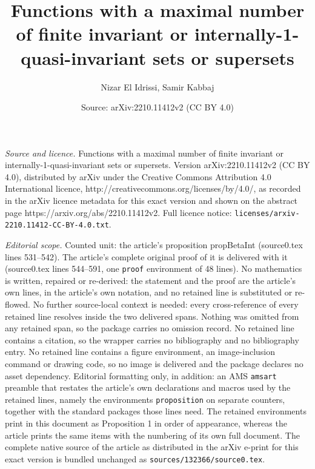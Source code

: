 \documentclass[10pt,a4paper]{amsart}
\title{Functions with a maximal number of finite invariant or internally-1-quasi-invariant sets or supersets}
\author{Nizar El Idrissi, Samir Kabbaj}
\date{Source: arXiv:2210.11412v2 (CC BY 4.0)}
\begin{document}
\maketitle

\noindent\emph{Source and licence.} Functions with a maximal number of finite invariant or internally-1-quasi-invariant sets or supersets. Version arXiv:2210.11412v2 (CC BY 4.0), distributed by arXiv under the Creative Commons Attribution 4.0 International licence, http://creativecommons.org/licenses/by/4.0/, as recorded in the arXiv licence metadata for this exact version and shown on the abstract page https://arxiv.org/abs/2210.11412v2. Full licence notice: \texttt{licenses/arxiv-2210.11412-CC-BY-4.0.txt}.\par\smallskip

\noindent\textit{Editorial scope.} Counted unit: the article's proposition propBetaInt (source0.tex lines 531--542). The article's complete original proof of it is delivered with it (source0.tex lines 544--591, one \texttt{proof} environment of 48 lines). No mathematics is written, repaired or re-derived: the statement and the proof are the article's own lines, in the article's own notation, and no retained line is substituted or re-flowed.  No further source-local context is needed: every cross-reference of every retained line resolves inside the two delivered spans.  Nothing was omitted from any retained span, so the package carries no omission record.  No retained line contains a citation, so the wrapper carries no bibliography and no bibliography entry.  No retained line contains a figure environment, an image-inclusion command or drawing code, so no image is delivered and the package declares no asset dependency.  Editorial formatting only, in addition: an AMS \texttt{amsart} preamble that restates the article's own declarations and macros used by the retained lines, namely the environments \texttt{proposition} on separate counters, together with the standard packages those lines need.  The retained environments print in this document as Proposition 1 in order of appearance, whereas the article prints the same items with the numbering of its own full document.  The complete native source of the article as distributed in the arXiv e-print for this exact version is bundled unchanged as \texttt{sources/132366/source0.tex}.
\end{document}
